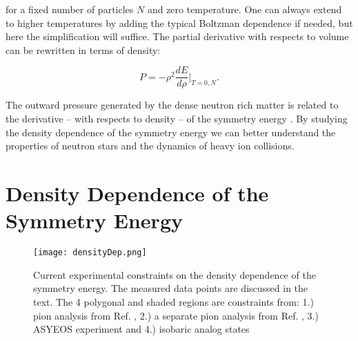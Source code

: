 for a fixed number of particles $N$ and zero temperature. One can always extend to higher temperatures by adding the typical Boltzman dependence if needed, but here the simplification will suffice. The partial derivative with respects to volume can be rewritten in terms of density:

\begin{equation}
P = -\rho^2 \frac{dE}{d\rho}\vert_{T=0,N}.
\label{eq:densEos}
\end{equation}

The outward pressure generated  by the dense neutron rich matter is related to the derivative -- with respects to density  -- of the symmetry energy \cite{tovEq}. By studying the density dependence of the symmetry energy we can better understand the properties of neutron stars and the dynamics of heavy ion collisions. 

\section{Density Dependence of the Symmetry Energy}

\begin{figure}[!htb]
\centering
\texttt{[image: densityDep.png]}
\caption{Current experimental constraints on the density dependence of the symmetry energy. The measured data points are discussed in the text. The 4 polygonal and shaded regions are constraints from: 1.) pion analysis from Ref. \cite{xia2009,xie2013}, 2.) a separate pion analysis from Ref. \cite{feng2010}, 3.) ASYEOS experiment \cite{russo2011, russo2016, cozma2013} and 4.) isobaric analog states \cite{dan2014} }
\label{fig:symDen}
\end{figure}

